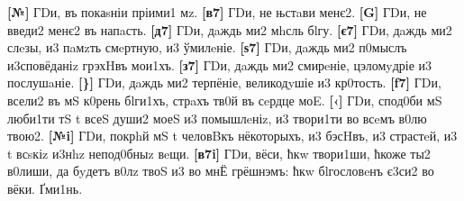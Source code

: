 \textbf{{[}№{]}} ГDи, въ покаsніи пріими1 мz. \textbf{{[}в7{]}} ГDи, не
њстaви менє2. \textbf{{[}G{]}} ГDи, не введи2 менє2 въ напaсть.
\textbf{{[}д7{]}} ГDи, дaждь ми2 мhсль бlгу. \textbf{{[}є7{]}} ГDи,
дaждь ми2 слeзы, и3 пaмzть смeртную, и3 ўмилeніе. \textbf{{[}ѕ7{]}} ГDи,
дaждь ми2 п0мыслъ и3сповёданіz грэхHвъ мои1хъ. \textbf{{[}з7{]}} ГDи,
дaждь ми2 смирeніе, цэломyдріе и3 послушaніе. \textbf{{[}\}{]}} ГDи,
дaждь ми2 терпёніе, великодyшіе и3 кр0тость. \textbf{{[}f7{]}} ГDи,
всели2 въ мS к0рень бlги1хъ, стрaхъ тв0й въ сeрдце моE. \textbf{{[}‹{]}}
ГDи, спод0би мS люби1ти тS t всеS души2 моеS и3 помышлeніz, и3 твори1ти
во всeмъ в0лю твою2. \textbf{{[}№i{]}} ГDи, покрhй мS t человBкъ
нёкоторыхъ, и3 бэсHвъ, и3 страстeй, и3 t всsкіz и3нhz непод0бныz вeщи.
\textbf{{[}в7i{]}} ГDи, вёси, ћкw твори1ши, ћкоже ты2 в0лиши, да бyдетъ
в0лz твоS и3 во мнЁ грёшнэмъ: ћкw бlгословeнъ є3си2 во вёки. Ґми1нь.
